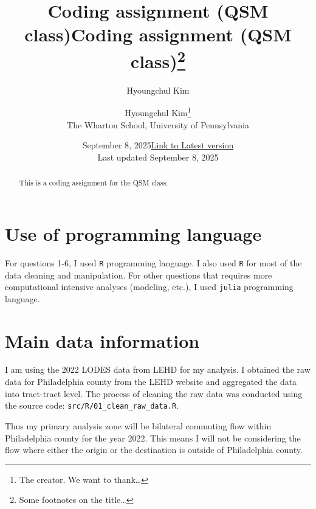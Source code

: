 \documentclass[
  11pt]{article}
\title{Coding assignment (QSM class)}
\author{Hyoungchul Kim}
\date{September 8, 2025}
\begin{document}
\def\spacingset#1{\renewcommand{\baselinestretch}%
{#1}\small\normalsize} \spacingset{1}



\date{\href{https://hchulkim.github.io}{Link to Latest version}\\ \vspace{1em}  Last updated September
8, 2025}
\title{Coding assignment (QSM class)\thanks{Some footnotes on the
title\ldots{}}}
\author{
Hyoungchul Kim\thanks{The creator. We want to thank\ldots{}}\\
The Wharton School, University of Pennsylvania\\
}
\maketitle

\bigskip
\bigskip
\begin{abstract}
This is a coding assignment for the QSM class.
\end{abstract}

\bigskip

\newpage
\spacingset{1.2} %

\section{Use of programming
language}\label{sec-use-of-programming-language}

For questions 1-6, I used \texttt{R} programming language. I also used
\texttt{R} for most of the data cleaning and manipulation. For other
questions that requires more computational intensive analyses (modeling,
etc.), I used \texttt{julia} programming language.

\section{Main data information}\label{sec-main-data-info}

I am using the 2022 LODES data from LEHD for my analysis. I obtained the
raw data for Philadelphia county from the LEHD website and aggregated
the data into tract-tract level. The process of cleaning the raw data
was conducted using the source code:
\texttt{src/R/01\_clean\_raw\_data.R}.

Thus my primary analysis zone will be bilateral commuting flow within
Philadelphia county for the year 2022. This means I will not be
considering the flow where either the origin or the destination is
outside of Philadelphia county.
\end{document}
